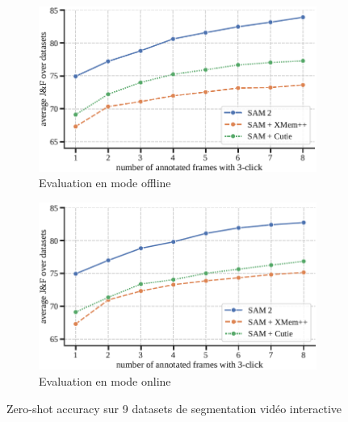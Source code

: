 \begin{figure}[H]
    \centering
    \begin{subfigure}[b]{0.75\textwidth}
        \centering
        \includegraphics[width=\textwidth]{02-main/figures/ch2/ch2_sam2_13_resultats_sam2_segmentation_video_offline.png}
        \caption{Evaluation en mode offline}
        \label{fig:ch2_sam2_13_resultats_sam2_segmentation_video_offline}
    \end{subfigure}
    \vspace{0.35cm}
    \begin{subfigure}[b]{0.75\textwidth}
        \centering
        \includegraphics[width=\textwidth]{02-main/figures/ch2/ch2_sam2_14_resultats_sam2_segmentation_video_online.png}
        \caption{Evaluation en mode online}
        \label{fig:ch2_sam2_14_resultats_sam2_segmentation_video_online}
    \end{subfigure}
    \caption{Zero-shot accuracy sur 9 datasets de segmentation vidéo interactive \cite{ravi_sam_2024}}
    \label{fig:ch2_sam2_resultats_sam2_segmentation_video}
\end{figure}


